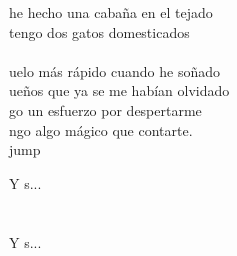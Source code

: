 \begin{cancion}
	 he hecho una cabaña en el tejado\\
	 tengo dos gatos domesticados\\
	\jump\\
	uelo más rápido cuando he soñado\\
	ueños que ya se me habían olvidado\\
	go un esfuerzo por despertarme\\
	ngo algo mágico que contarte.\\jump\\
	\begin{chorus}%
	Y s... \\
	\jump\\
	       \\
	Y s... \\
	\end{chorus}%
	\jump\\
\end{cancion}%
